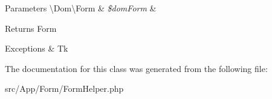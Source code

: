 \begin{DoxyParams}[1]{Parameters}
\textbackslash{}\+Dom\textbackslash{}\+Form & {\em \$dom\+Form} & \\
\hline
\end{DoxyParams}
\begin{DoxyReturn}{Returns}
Form 
\end{DoxyReturn}

\begin{DoxyExceptions}{Exceptions}
{\em } & Tk \\
\hline
\end{DoxyExceptions}


The documentation for this class was generated from the following file\+:\begin{DoxyCompactItemize}
\item 
src/\+App/\+Form/Form\+Helper.\+php\end{DoxyCompactItemize}
